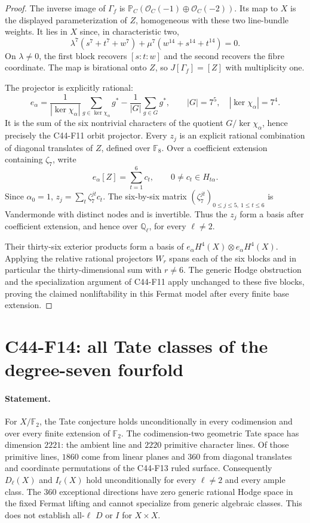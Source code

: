 \documentclass[11pt]{article}
\theoremstyle{remark}\newtheorem{remark}[theorem]{Remark}
\begin{document}
\begin{proof}
The inverse image of \(\Gamma_f\) is
\(\mathbb P_C(\mathcal O_C(-1)\oplus\mathcal O_C(-2))\).
Its map to \(X\) is the displayed parameterization of \(Z\),
homogeneous with these two line-bundle weights. It lies in \(X\)
since, in characteristic two,
\[
 \lambda^7(s^7+t^7+w^7)
 +\mu^7(w^{14}+s^{14}+t^{14})=0.
\]
On \(\lambda\ne0\), the first block recovers \([s:t:w]\) and
the second recovers the fibre coordinate. The map is birational
onto \(Z\), so \(J[\Gamma_f]=[Z]\) with multiplicity one.

The projector is explicitly rational:
\[
 e_\alpha=
 \frac1{|\ker\chi_\alpha|}\sum_{g\in\ker\chi_\alpha}g^*
 -\frac1{|G|}\sum_{g\in G}g^*,
 \qquad |G|=7^5,\quad|\ker\chi_\alpha|=7^4.
\]
It is the sum of the six nontrivial characters of the quotient
\(G/\ker\chi_\alpha\), hence precisely the C44-F11 orbit projector.
Every \(z_j\) is an explicit rational combination of diagonal
translates of \(Z\), defined over \(\mathbb F _8\).
Over a coefficient extension containing \(\zeta _7\), write
\[
 e_\alpha[Z]=\sum_{t=1}^6c_t,\qquad
 0\ne c_t\in H_{t\alpha}.
\]
Since \(\alpha_0=1\), \(z_j=\sum_t\zeta _7^{jt}c_t\).
The six-by-six matrix \((\zeta _7^{jt})_{0\le j\le5,\ 1\le t\le6}\)
is Vandermonde with distinct nodes and is invertible.
Thus the \(z_j\) form a basis after coefficient extension,
and hence over \(\mathbb Q_\ell\), for every \(\ell\ne2\).

Their thirty-six exterior products form a basis of
\(e_\alpha H^4(X)\otimes e_\alpha H^4(X)\).
Applying the relative rational projectors \(W_r\) spans each
of the six blocks and in particular the thirty-dimensional
sum with \(r\ne6\). The generic Hodge obstruction and the
specialization argument of C44-F11 apply unchanged to these
five blocks, proving the claimed nonliftability in this
Fermat model after every finite base extension.
\end{proof}

\section{C44-F14: all Tate classes of the degree-seven fourfold}
\label{sec:C44-F14}
\paragraph{Statement.}
For \(X/\mathbb F _2\), the Tate conjecture holds unconditionally
in every codimension and over every finite extension of
\(\mathbb F _2\). The codimension-two geometric Tate space has
dimension \(2221\): the ambient line and \(2220\) primitive
character lines. Of those primitive lines, \(1860\) come from
linear planes and \(360\) from diagonal translates and coordinate
permutations of the C44-F13 ruled surface.
Consequently \(D_\ell(X)\) and \(I_\ell(X)\) hold unconditionally
for every \(\ell\ne2\) and every ample class.
The \(360\) exceptional directions have zero generic rational
Hodge space in the fixed Fermat lifting and cannot specialize
from generic algebraic classes. This does not establish all-\(\ell\)
\(D\) or \(I\) for \(X\times X\).
\end{document}
